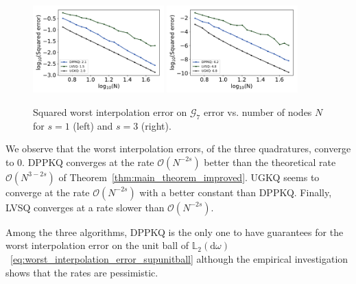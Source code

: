 \documentclass[twoside,11pt]{book}
\numberwithin{theorem}{chapter}
\numberwithin{definition}{chapter}
\numberwithin{proposition}{chapter}
\numberwithin{corollary}{chapter}
\numberwithin{example}{chapter}
\numberwithin{lemma}{chapter}
\numberwithin{assumption}{chapter}
\DeclareMathOperator{\X}{\mathcal{X}}
\begin{document}
\begin{figure}
\centering
\includegraphics[width=0.45\textwidth]{img/neurips/Sobolev/suponunitball_interpolation_pSobolev_s_1_binarycubeM_64_fig_1.pdf}
\includegraphics[width=0.45\textwidth]{img/neurips/Sobolev/suponunitball_interpolation_pSobolev_s_3_binarycubeM_64_fig_1.pdf}\\
\caption{Squared worst interpolation error on $\mathcal{G}_{7}$ error vs. number of nodes $N$ for $s = 1$ (left) and $s=3$ (right).
\label{fig:pDPP_results_pSobolev_exp_3_G7}}
\end{figure}
We observe that the worst interpolation errors, of the three quadratures, converge  to $0$. DPPKQ converges at the rate $\mathcal{O}(N^{-2s})$ better than the theoretical rate $\mathcal{O}(N^{3-2s})$ of Theorem~\ref{thm:main_theorem_improved}. UGKQ seems to converge at the rate $\mathcal{O}(N^{-2s})$ with a better constant than DPPKQ. Finally, LVSQ converges at a rate slower than $\mathcal{O}(N^{-2s})$. 

Among the three algorithms, DPPKQ is the only one to have guarantees for the worst interpolation error on the unit ball of $\mathbb{L}_{2}(\mathrm{d}\omega)$~\eqref{eq:worst_interpolation_error_supunitball} although the empirical investigation shows that the rates are pessimistic.
\end{document}
